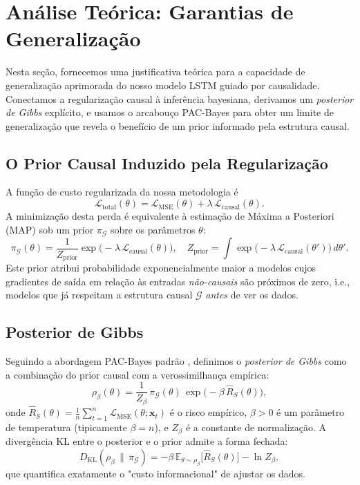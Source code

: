 \documentclass[12pt, a4paper]{article}
\begin{document}
\section{Análise Teórica: Garantias de Generalização}

Nesta seção, fornecemos uma justificativa teórica para a capacidade de generalização aprimorada do nosso modelo LSTM guiado por causalidade. Conectamos a regularização causal à inferência bayesiana, derivamos um \emph{posterior de Gibbs} explícito, e usamos o arcabouço PAC-Bayes para obter um limite de generalização que revela o benefício de um prior informado pela estrutura causal.

\subsection{O Prior Causal Induzido pela Regularização}

A função de custo regularizada da nossa metodologia é
\[
\mathcal{L}_{\mathrm{total}}(\theta) = \mathcal{L}_{\mathrm{MSE}}(\theta) + \lambda\,\mathcal{L}_{\mathrm{causal}}(\theta).
\]
A minimização desta perda é equivalente à estimação de Máxima a Posteriori (MAP) sob um prior $\pi_{\mathcal G}$ sobre os parâmetros $\theta$:
\[
\pi_{\mathcal G}(\theta) = \frac{1}{Z_{\mathrm{prior}}} \exp\bigl(-\lambda\,\mathcal{L}_{\mathrm{causal}}(\theta)\bigr), \quad Z_{\mathrm{prior}} = \int \exp\bigl(-\lambda\,\mathcal{L}_{\mathrm{causal}}(\theta')\bigr)\,d\theta'.
\]
Este prior atribui probabilidade exponencialmente maior a modelos cujos gradientes de saída em relação às entradas \emph{não-causais} são próximos de zero, i.e., modelos que já respeitam a estrutura causal $\mathcal{G}$ \emph{antes} de ver os dados.

\subsection{Posterior de Gibbs}

Seguindo a abordagem PAC-Bayes padrão \cite{alquier2024}, definimos o \emph{posterior de Gibbs} como a combinação do prior causal com a verossimilhança empírica:
\[
\rho_{\beta}(\theta) = \frac{1}{Z_{\beta}}\,\pi_{\mathcal G}(\theta)\,\exp\bigl(-\beta\,\hat{R}_S(\theta)\bigr),
\]
onde $\hat{R}_S(\theta) = \frac{1}{n}\sum_{t=1}^n \mathcal{L}_{\mathrm{MSE}}(\theta; \mathbf{x}_t)$ é o risco empírico, $\beta > 0$ é um parâmetro de temperatura (tipicamente $\beta = n$), e $Z_{\beta}$ é a constante de normalização. A divergência KL entre o posterior e o prior admite a forma fechada:
\[
D_{\mathrm{KL}}(\rho_{\beta}\,\|\,\pi_{\mathcal G}) = -\beta\,\mathbb{E}_{\theta\sim\rho_{\beta}}\bigl[\hat{R}_S(\theta)\bigr] - \ln Z_{\beta},
\]
que quantifica exatamente o "custo informacional" de ajustar os dados.
\end{document}
